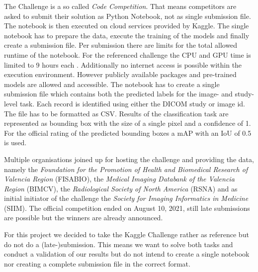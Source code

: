 The Challenge is a so called \textit{Code Competition}. That means competitors are asked to submit their solution as Python Notebook, not as single submission file. The notebook is then executed on cloud services provided by Kaggle. The single notebook has to prepare the data, execute the training of the models and finally create a submission file. Per submission there are limits for the total allowed runtime of the notebook. For the referenced challenge the CPU and GPU time is limited to 9 hours each \autocite{SIIMKaggle}. Additionally no internet access is possible within the execution environment. However publicly available packages and pre-trained models are allowed and accessible. The notebook has to create a single submission file which contains both the predicted labels for the image- and study-level task. Each record is identified using either the DICOM study or image id. The file has to be formatted as CSV. Results of the classification task are represented as bounding box with the size of a single pixel and a confidence of 1. For the official rating of the predicted bounding boxes a \ac{mAP} with an \ac{IoU} of 0.5 is used.

Multiple organisations joined up for hosting the challenge and providing the data, namely the \textit{Foundation for the Promotion of Health and Biomedical Research of Valencia Region} (FISABIO), the \textit{Medical Imaging Databank of the Valencia Region} (BIMCV), the \textit{Radiological Society of North America} (RSNA) and as initial initiator of the challenge the \textit{Society for Imaging Informatics in Medicine} (SIIM). The official competition ended on August 10, 2021, still late submissions are possible but the winners are already announced.

For this project we decided to take the Kaggle Challenge rather as reference but do not do a (late-)submission. This means we want to solve both tasks and conduct a validation of our results but do not intend to create a single notebook nor creating a complete submission file in the correct format. 



